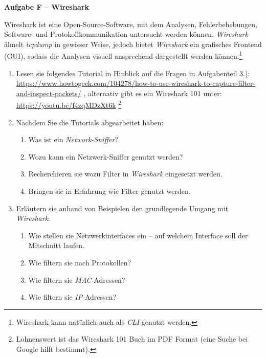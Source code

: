 \documentclass[paper=a4,fontsize=11pt]{scrartcl}%
\numberwithin{equation}{section}
\begin{document}
\begin{center}\Large{\textbf{Aufgabe F -- Wireshark}}\end{center}\vskip0.25in
Wireshark ist eine Open-Source-Software, mit dem Analysen, Fehlerbehebungen, Software- und Protokollkommunikation untersucht werden können. \emph{Wireshark} ähnelt \emph{tcpdump} in gewisser Weise, jedoch bietet \emph{Wireshark} ein grafisches Frontend (GUI), sodass die Analysen visuell ansprechend dargestellt werden können.\footnote{Wireshark kann natürlich auch als \emph{CLI} genutzt werden.}
\begin{enumerate}
	\item Lesen sie folgendes Tutorial in Hinblick auf die Fragen in Aufgabenteil 3.): \url{https://www.howtogeek.com/104278/how-to-use-wireshark-to-capture-filter-and-inspect-packets/}
	, alternativ gibt es ein Wireshark 101 unter: \url{https://youtu.be/f4zqMDzXt6k} 
	\footnote{Lohnenswert ist das Wireshark 101 Buch im PDF Format (eine Suche bei Google hilft bestimmt).}
	\item Nachdem Sie die Tutorials abgearbeitet haben:
	\begin{enumerate}
		\item Was ist ein \emph{Network-Sniffer}?
		\item Wozu kann ein Netzwerk-Sniffer genutzt werden?
		\item Recherchieren sie wozu Filter in \emph{Wireshark} eingesetzt werden.
		\item Bringen sie in Erfahrung wie Filter genutzt werden.
	\end{enumerate}
	\item Erläutern sie anhand von Beispielen den grundlegende Umgang mit \emph{Wireshark}.
	\begin{enumerate}
		\item Wie stellen sie Netzwerkinterfaces ein -- auf welchem Interface soll der Mitschnitt laufen.
		\item Wie filtern sie nach Protokollen?
		\item Wie filtern sie \emph{MAC}-Adressen?
		\item Wie filtern sie \emph{IP}-Adressen?
	\end{enumerate}
\end{enumerate}
\end{document}
